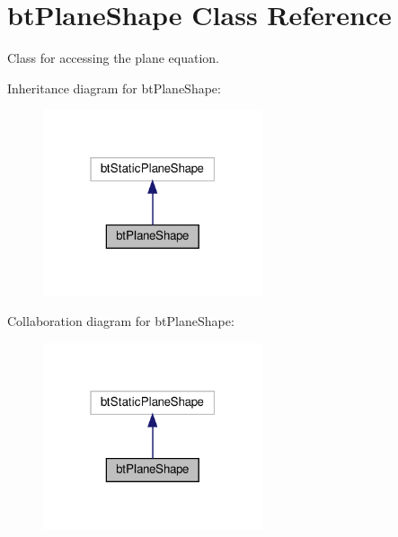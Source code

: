 \hypertarget{classbtPlaneShape}{}\section{bt\+Plane\+Shape Class Reference}
\label{classbtPlaneShape}


Class for accessing the plane equation.  




Inheritance diagram for bt\+Plane\+Shape\+:
\nopagebreak
\begin{figure}[H]
\begin{center}
\leavevmode
\includegraphics[width=183pt]{classbtPlaneShape__inherit__graph}
\end{center}
\end{figure}


Collaboration diagram for bt\+Plane\+Shape\+:
\nopagebreak
\begin{figure}[H]
\begin{center}
\leavevmode
\includegraphics[width=183pt]{classbtPlaneShape__coll__graph}
\end{center}
\end{figure}
